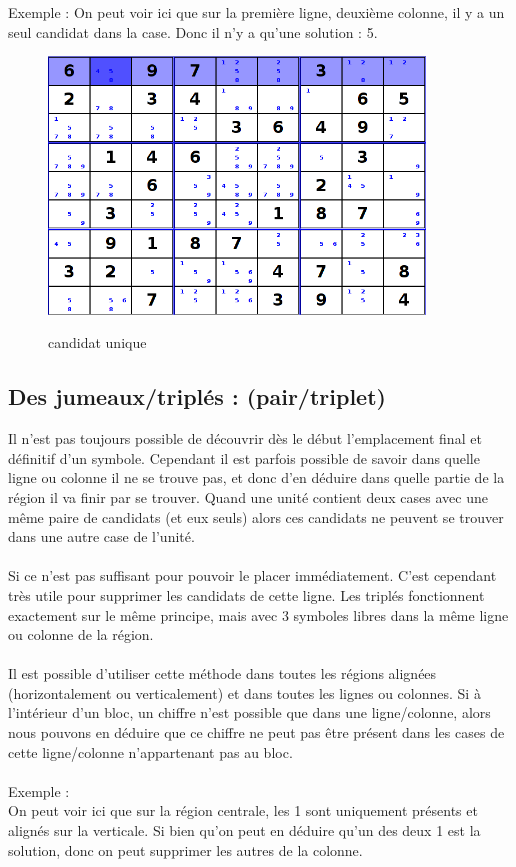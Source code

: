 Exemple :
On peut voir ici que sur la première ligne, deuxième colonne, il y a un seul candidat 
dans la case. Donc il n'y a qu'une solution : 5.\\

\begin{figure}[ht]
  \caption{\label{annexe2} candidat unique}
  \includegraphics [width=100mm]{images/one-candidate.png} \\[0.5cm]
\end{figure}


\subsection{Des jumeaux/triplés : (pair/triplet)}
Il n'est pas toujours possible de découvrir dès le début l'emplacement final et définitif d'un symbole. 
Cependant il est parfois possible de savoir dans quelle ligne ou colonne il ne se trouve pas, et donc 
d'en déduire dans quelle partie de la région il va finir par se trouver.
Quand une unité contient deux cases avec une même paire de candidats (et eux seuls) alors ces candidats 
ne peuvent se trouver dans une autre case de l'unité. \\
\\
Si ce n'est pas suffisant pour pouvoir le placer immédiatement. C'est cependant très utile pour 
supprimer les candidats de cette ligne.
Les triplés fonctionnent exactement sur le même principe, mais avec 3 symboles libres dans la même 
ligne ou colonne de la région.\\
\\
Il est possible d'utiliser cette méthode dans toutes les régions alignées (horizontalement ou verticalement) 
et dans toutes les lignes ou colonnes.
Si à l’intérieur d’un bloc, un chiffre n’est possible que dans une ligne/colonne, alors
nous pouvons en déduire que ce chiffre ne peut pas être présent dans les cases de cette
ligne/colonne n’appartenant pas au bloc.\\
\\
Exemple :\\
On peut voir ici que sur la région centrale, les 1 sont uniquement présents 
et alignés sur la verticale.
Si bien qu'on peut en déduire qu'un des deux 1 est la solution, 
donc on peut supprimer les autres de la colonne.\\

